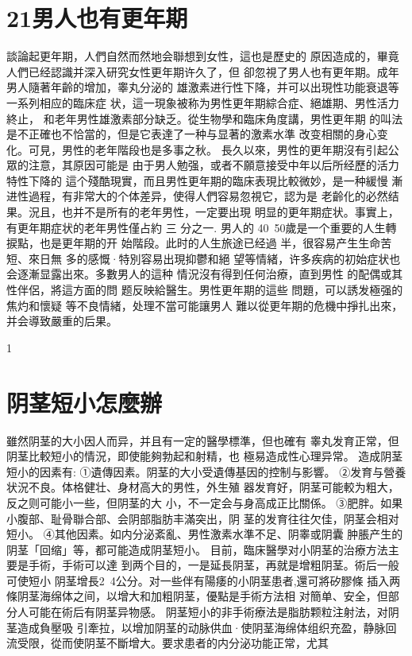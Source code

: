 \documentclass[12pt,UTF8]{ctexbook}
\begin{document}
\section{21男人也有更年期}
談論起更年期，人們自然而然地会聯想到女性，這也是歷史的
原因造成的，畢竟人們已经認識并深入研究女性更年期许久了，但
卻忽視了男人也有更年期。成年男人隨著年齡的增加，睾丸分泌的
雄激素进行性下降，并可以出現性功能衰退等一系列相应的臨床症
状，這一現象被称为男性更年期綜合症、絕雄期、男性活力終止，
和老年男性雄激素部分缺乏。從生物學和臨床角度講，男性更年期
的叫法是不正確也不恰當的，但是它表達了一种与显著的激素水準
改变相關的身心变化。可見，男性的老年階段也是多事之秋。
長久以來，男性的更年期沒有引起公眾的注意，其原因可能是
由于男人勉强，或者不願意接受中年以后所经歷的活力特性下降的
這个殘酷現實，而且男性更年期的臨床表現比較微妙，是一种緩慢
漸进性過程，有非常大的个体差异，使得人們容易忽視它，認为是
老齡化的必然结果。況且，也并不是所有的老年男性，一定要出現
明显的更年期症状。事實上，有更年期症状的老年男性僅占約 三
分之一.
男人的 40~50歲是一个重要的人生轉捩點，也是更年期的开
始階段。此时的人生旅途已经過
半，很容易产生生命苦短、來日無
多的感慨·特別容易出現抑鬱和絕
望等情緒，许多疾病的初始症状也
会逐漸显露出來。多數男人的這种
情況沒有得到任何治療，直到男性
的配偶或其性伴侶，將這方面的問
题反映給醫生。男性更年期的這些
問題，可以誘发極强的焦灼和懷疑
等不良情緒，处理不當可能讓男人
難以從更年期的危機中掙扎出來，
并会導致嚴重的后果。

1
\section{阴茎短小怎麼辦}
雖然阴茎的大小因人而异，并且有一定的醫學標準，但也確有
睾丸发育正常，但阴茎比較短小的情況，即使能夠勃起和射精，也
極易造成性心理异常。
造成阴茎短小的因素有:
①遺傳因素。阴茎的大小受遺傳基因的控制与影響。
②发育与營養状況不良。体格健壮、身材高大的男性，外生殖
器发育好，阴茎可能較为粗大，反之则可能小一些，但阴茎的大
小，不一定会与身高成正比關係。
③肥胖。如果小腹部、耻骨聯合部、会阴部脂肪丰滿突出，阴
茎的发育往往欠佳，阴茎会相对短小。
④其他因素。如内分泌紊亂、男性激素水準不足、阴睾或阴囊
肿脹产生的阴茎「回缩」等，都可能造成阴茎短小。
目前，臨床醫學对小阴茎的治療方法主要是手術，手術可以達
到两个目的，一是延長阴茎，再就是增粗阴茎。術后一般可使短小
阴茎增長2~4公分。对一些伴有陽痿的小阴茎患者,還可將矽膠條
插入两條阴茎海绵体之间，以增大和加粗阴茎，優點是手術方法相
对簡单、安全，但部分人可能在術后有阴茎异物感。
阴茎短小的非手術療法是脂肪颗粒注射法，对阴茎造成負壓吸
引牽拉，以增加阴茎的动脉供血·使阴茎海绵体组织充盈，静脉回
流受限，從而使阴茎不斷增大。要求患者的内分泌功能正常，尤其
\end{document}
